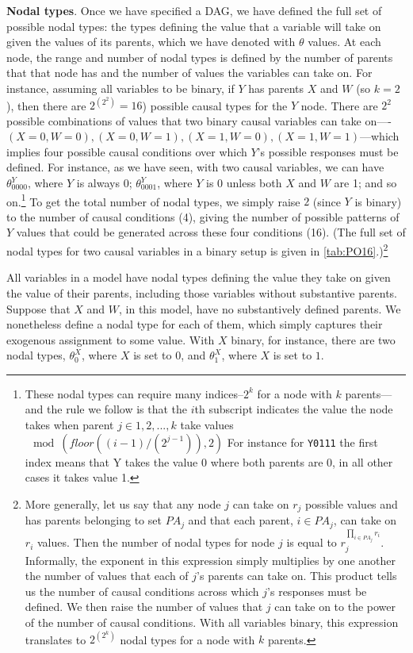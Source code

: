 \documentclass[
  12pt,
]{book}
\begin{document}
\textbf{Nodal types}. Once we have specified a DAG, we have defined the full set of possible nodal types: the types defining the value that a variable will take on given the values of its parents, which we have denoted with \(\theta\) values. At each node, the range and number of nodal types is defined by the number of parents that that node has and the number of values the variables can take on. For instance, assuming all variables to be binary, if \(Y\) has parents \(X\) and \(W\) (so \(k=2\)), then there are \(2^{\left(2^2\right)}=16\)) possible causal types for the \(Y\) node. There are \(2^2\) possible combinations of values that two binary causal variables can take on----\((X=0,W=0), (X=0,W=1), (X=1,W=0), (X=1,W=1)\)---which implies four possible causal conditions over which \(Y\)'s possible responses must be defined. For instance, as we have seen, with two causal variables, we can have \(\theta^Y_{0000}\), where \(Y\) is always 0; \(\theta^Y_{0001}\), where \(Y\) is 0 unless both \(X\) and \(W\) are 1; and so on.\footnote{These nodal types can require many indices--\(2^k\) for a node with \(k\) parents---and the rule we follow is that the \(i\)th subscript indicates the value the node takes when parent \(j \in {1, 2, ..., k}\) take values \(\mod(floor((i-1)/(2^{j-1})), 2)\) For instance for \texttt{Y0111} the first index means that Y takes the value 0 where both parents are 0, in all other cases it takes value 1.} To get the total number of nodal types, we simply raise \(2\) (since \(Y\) is binary) to the number of causal conditions (4), giving the number of possible patterns of \(Y\) values that could be generated across these four conditions (16). (The full set of nodal types for two causal variables in a binary setup is given in \ref{tab:PO16}.)\footnote{More generally, let us say that any node \(j\) can take on \(r_j\) possible values and has parents belonging to set \(PA_j\) and that each parent, \(i \in PA_j\), can take on \(r_i\) values. Then the number of nodal types for node \(j\) is equal to \(r_j^{\prod_{i \in PA_j}r_i}\). Informally, the exponent in this expression simply multiplies by one another the number of values that each of \(j\)'s parents can take on. This product tells us the number of causal conditions across which \(j\)'s responses must be defined. We then raise the number of values that \(j\) can take on to the power of the number of causal conditions. With all variables binary, this expression translates to \(2^{\left(2^k\right)}\) nodal types for a node with \(k\) parents.}

All variables in a model have nodal types defining the value they take on given the value of their parents, including those variables without substantive parents. Suppose that \(X\) and \(W\), in this model, have no substantively defined parents. We nonetheless define a nodal type for each of them, which simply captures their exogenous assignment to some value. With \(X\) binary, for instance, there are two nodal types, \(\theta^X_{0}\), where \(X\) is set to \(0\), and \(\theta^X_{1}\), where \(X\) is set to \(1\).
\end{document}
